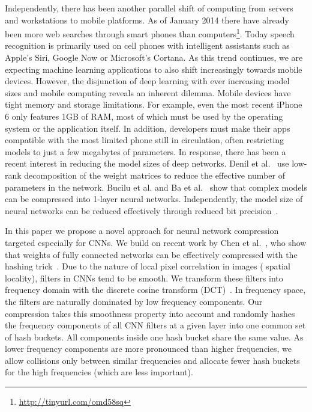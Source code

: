 \documentclass{article} %
\begin{document}
Independently, there has been another parallel shift of computing from servers and workstations to mobile platforms. As of January 2014 there have already been more web searches through smart phones than computers\footnote{\url{http://tinyurl.com/omd58sq}}. Today speech recognition is primarily used on cell phones with intelligent assistants such as Apple's Siri, Google Now or Microsoft's Cortana. As this trend continues,  we are expecting machine learning applications to also shift increasingly towards mobile devices.
However, the disjunction of deep learning with ever increasing model sizes and mobile computing reveals an inherent dilemma. Mobile devices have tight memory and storage limitations. For example, even the most recent iPhone 6 only features 1GB of RAM, most of which must be used by the operating system or the application itself. In addition, developers must make their apps compatible with the most limited phone still in circulation, often restricting models to just a few megabytes of parameters.
In response, there has been a recent interest in reducing the model sizes of deep networks. Denil et al.~\cite{denil2013predicting} use low-rank decomposition of the weight matrices to reduce the effective number of parameters in the network. Bucilu et al. \cite{bucilua2006model} and Ba et al.~\cite{Caruana2014} show that complex models can be compressed into 1-layer neural networks. Independently, the model size of neural networks can be reduced effectively through reduced bit precision~\cite{courbariaux2015low}. 

In this paper we propose a novel approach for neural network compression targeted especially for CNNs. We build on recent work by Chen et al.~\cite{chen2015compressing}, who show that weights of fully connected networks can be effectively compressed with the hashing trick~\cite{weinberger09feature}.
Due to the nature of local pixel correlation in images (\ie{} spatial locality), filters in CNNs tend to be smooth. We transform these filters into frequency domain with the discrete cosine transform (DCT)~\cite{rao2014discrete}. In frequency space, the filters are naturally dominated by low frequency components. Our compression takes this smoothness property into account and randomly hashes the frequency components of all CNN filters at a given layer into one common set of hash buckets. All components inside one hash bucket share the same value. As lower frequency components are more pronounced than higher frequencies, we allow collisions only between similar frequencies and allocate fewer hash buckets for the high frequencies (which are less important).
\end{document}
